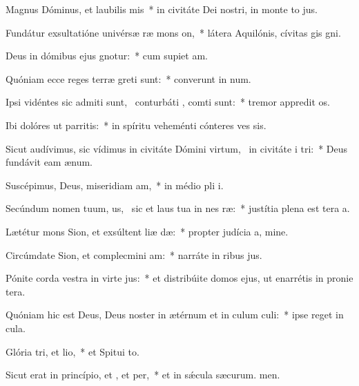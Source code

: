 \item Magnus Dóminus, et laubilis mis~* in civitáte Dei nostri, in monte to jus.
\item Fundátur exsultatióne univérsæ ræ mons on,~* látera Aquilónis, cívitas gis gni.
\item Deus in dómibus ejus gnotur:~* cum supiet am.
\item Quóniam ecce reges terræ greti sunt:~* converunt in num.
\item Ipsi vidéntes sic admiti sunt,~\pscross{} conturbáti , comti sunt:~* tremor appredit os.
\item Ibi dolóres ut parritis:~* in spíritu veheménti cónteres ves sis.
\item Sicut audívimus, sic vídimus in civitáte Dómini virtum,~\pscross{} in civitáte i tri:~* Deus fundávit eam  ænum.
\item Suscépimus, Deus, miseridiam am,~* in médio pli i.
\item Secúndum nomen tuum, us,~\pscross{} sic et laus tua in nes ræ:~* justítia plena est tera a.
\item Lætétur mons Sion, et exsúltent liæ dæ:~* propter judícia a, mine.
\item Circúmdate Sion, et complecmini am:~* narráte in ribus jus.
\item Pónite corda vestra in virte jus:~* et distribúite domos ejus, ut enarrétis in pronie tera.
\item Quóniam hic est Deus, Deus noster in ætérnum et in culum culi:~* ipse reget  in cula.
\item Glória tri, et lio,~* et Spitui to.
\item Sicut erat in princípio, et , et per,~* et in sǽcula sæcurum. men.
